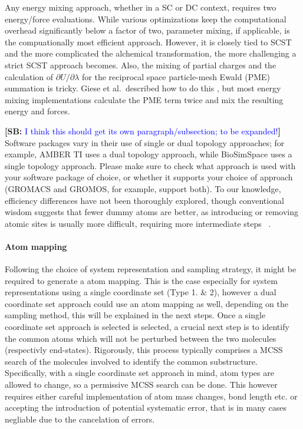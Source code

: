\documentclass[9pt,bestpractices]{livecoms}
\newcommand{\sbnote}[1]{%
  {\bfseries{}[SB: }%
  {\textcolor{blue}{#1}}{\bfseries{}]}
  }
\begin{document}
Any energy mixing approach, whether in a SC or DC context, requires two energy/force evaluations. While various optimizations keep the computational overhead significantly below a factor of two,  parameter mixing, if applicable, is the compuationally most efficient approach. However, it is closely tied to SCST and the more complicated the alchemical transformation, the more challenging a strict SCST approach becomes. Also, the mixing of partial charges and the calculation of $\partial U/\partial\lambda$ for the reciprocal space particle-mesh Ewald (PME) summation is tricky. Giese et al.\ described how to do this \cite{Giese_2018}, but most energy mixing implementations calculate the PME term twice and mix the resulting energy and forces.

\sbnote{I think this should get its own paragraph/subsection; to be expanded!} Software packages vary in their use of single or dual topology approaches; for example, AMBER TI uses a dual topology approach, while BioSimSpace uses a single topology approach. Please make sure to check what approach is used with your software package of choice, or whether it supports your choice of approach (GROMACS and GROMOS, for example, support both). 
To our knowledge, efficiency differences have not been thoroughly explored, though conventional wisdom suggests that fewer dummy atoms are better, as introducing or removing atomic sites is usually more difficult, requiring more intermediate steps ~\cite{liu2013lead, mobley2012perspective}.

\paragraph{Atom mapping}
Following the choice of system representation and sampling strategy, it might be required to generate a atom mapping. This is the case especially for system representations using a single coordinate set (Type 1. & 2), however a dual coordinate set approach could use an atom mapping as well, depending on the sampling method, this will be explained in the next steps.
Once a single coordinate set approach is selected is selected, a crucial next step is to identify the common atoms which will not be perturbed between the two molecules (respectivly end-states).
Rigorously, this process typically comprises a MCSS search of the molecules involved to identify the common substructure.
Specifically, with a single coordinate set approach in mind, atom types are allowed to change, so a permissive MCSS search can be done. This however requires either careful implementation of atom mass changes, bond length etc. or accepting the introduction of potential systematic error, that is in many cases negliable due to the cancelation of errors. \cite{ries2024Kartograf}
\end{document}

